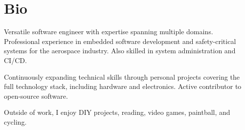 \documentclass[letterpaper]{twentysecondcv} %
\begin{document}








\makeprofile %

\vfill


\section{Bio}

Versatile software engineer with expertise spanning multiple domains. Professional
experience in embedded software development and safety-critical systems for the
aerospace industry. Also skilled in system administration and CI/CD.

Continuously expanding technical skills through personal projects covering the full
technology stack, including hardware and electronics. Active contributor to open-source
software.

Outside of work, I enjoy DIY projects, reading, video games, paintball, and cycling.

\vfill
\end{document}
